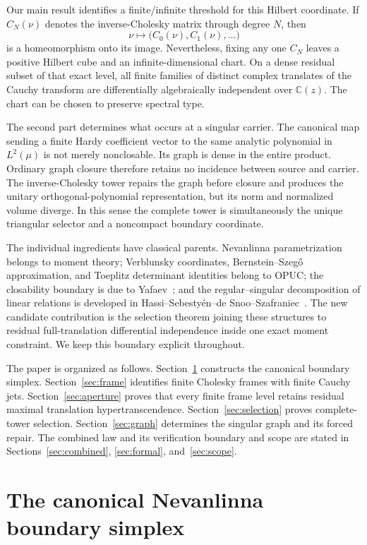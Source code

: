 \documentclass[11pt]{article}
\newcommand{\C}{\mathbb C}
\begin{document}
Our main result identifies a finite/infinite threshold for this Hilbert coordinate.  If
$C_N(\nu)$ denotes the inverse-Cholesky matrix through degree $N$, then
\[
  \nu\longmapsto \bigl(C_0(\nu),C_1(\nu),\ldots\bigr)
\]
is a homeomorphism onto its image.  Nevertheless, fixing any one $C_N$ leaves a positive
Hilbert cube and an infinite-dimensional chart.  On a dense residual subset of that exact level, all finite
families of distinct complex translates of the Cauchy transform are differentially algebraically
independent over $\C(z)$.  The chart can be chosen to preserve spectral type.

The second part determines what occurs at a singular carrier.  The canonical map sending a finite
Hardy coefficient vector to the same analytic polynomial in $L^2(\mu)$ is not merely
nonclosable.  Its graph is dense in the entire product.  Ordinary graph closure therefore retains
no incidence between source and carrier.  The inverse-Cholesky tower repairs the graph before
closure and produces the unitary orthogonal-polynomial representation, but its norm and normalized
volume diverge.  In this sense the complete tower is simultaneously the unique triangular
selector and a noncompact boundary coordinate.

The individual ingredients have classical parents.  Nevanlinna parametrization belongs to moment
theory; Verblunsky coordinates, Bernstein--Szeg\H{o} approximation, and Toeplitz determinant
identities belong to OPUC; the closability boundary is due to Yafaev~\cite{Yafaev2016}; and the
regular--singular decomposition of linear relations is developed in
Hassi--Sebesty\'en--de Snoo--Szafraniec~\cite{HassiEtAl2007}.  The new candidate contribution is
the selection theorem joining these structures to residual full-translation differential
independence inside one exact moment constraint.  We keep this boundary explicit throughout.

The paper is organized as follows.  Section~\ref{sec:boundary} constructs the canonical boundary
simplex.  Section~\ref{sec:frame} identifies finite Cholesky frames with finite Cauchy jets.
Section~\ref{sec:aperture} proves that every finite frame level retains residual maximal
translation hypertranscendence.  Section~\ref{sec:selection} proves complete-tower selection.
Section~\ref{sec:graph} determines the singular graph and its forced repair.  The combined law and
its verification boundary and scope are stated in
Sections~\ref{sec:combined}, \ref{sec:formal}, and~\ref{sec:scope}.

\section{The canonical Nevanlinna boundary simplex}\label{sec:boundary}
\end{document}
